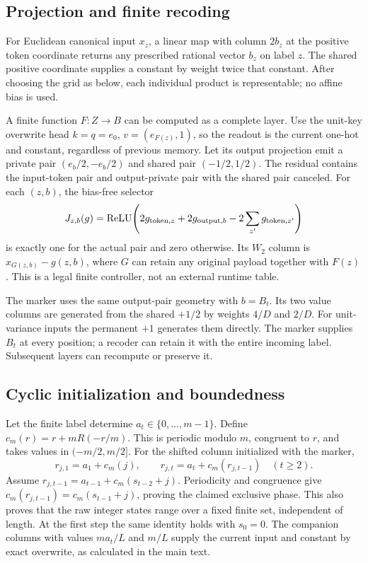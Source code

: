 \documentclass[10pt]{article}
\theoremstyle{remark}
\newcommand{\relu}{\operatorname{ReLU}}
\begin{document}
\subsection{Projection and finite recoding}
For Euclidean canonical input $x_z$, a linear map with column $2b_z$ at the
positive token coordinate returns any prescribed rational vector $b_z$ on
label $z$. The shared positive coordinate supplies a constant by weight twice
that constant. After choosing the grid as below, each individual product is
representable; no affine bias is used.

A finite function $F:Z\to B$ can be computed as a complete layer. Use the
unit-key overwrite head $k=q=e_0$, $v=(e_{F(z)},1)$, so the readout is the
current one-hot and constant, regardless of previous memory. Let its output
projection emit a private pair $(e_b/2,-e_b/2)$ and shared pair $(-1/2,1/2)$.
The residual contains the input-token pair and output-private pair with the
shared pair canceled. For each $(z,b)$, the bias-free selector
\[
 J_{z,b}(g)=\relu\!\left(2g_{{\rm token},z}
       +2g_{{\rm output},b}-2\sum_{z'}g_{{\rm token},z'}\right)
\]
is exactly one for the actual pair and zero otherwise. Its $W_2$ column is
$x_{G(z,b)}-g(z,b)$, where $G$ can retain any original payload together with
$F(z)$. This is a legal finite controller, not an external runtime table.

The marker uses the same output-pair geometry with $b=B_t$. Its two value
columns are generated from the shared $+1/2$ by weights $4/D$ and $2/D$.
For unit-variance inputs the permanent $+1$ generates them directly.
The marker supplies $B_t$ at every position; a recoder can retain it with the
entire incoming label. Subsequent layers can recompute or preserve it.

\subsection{Cyclic initialization and boundedness}
Let the finite label determine $a_t\in\{0,\ldots,m-1\}$. Define
$c_m(r)=r+mR(-r/m)$. This is periodic modulo $m$, congruent to $r$, and takes
values in $(-m/2,m/2]$. For the shifted column initialized with the marker,
\[
 r_{j,1}=a_1+c_m(j),\qquad
 r_{j,t}=a_t+c_m(r_{j,t-1})\quad(t\ge2).
\]
Assume $r_{j,t-1}=a_{t-1}+c_m(s_{t-2}+j)$. Periodicity and congruence give
$c_m(r_{j,t-1})=c_m(s_{t-1}+j)$, proving the claimed exclusive phase. This
also proves that the raw integer states range over a fixed finite set,
independent of length. At the first step the same identity holds with $s_0=0$.
The companion columns with values $ma_t/L$ and $m/L$ supply the current input
and constant by exact overwrite, as calculated in the main text.
\end{document}
